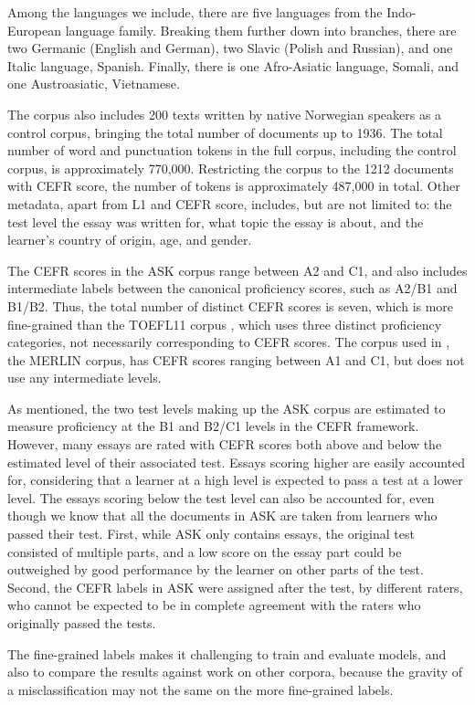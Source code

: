 Among the languages we include, there are five languages from the
Indo-European language family. Breaking them further down into branches,
there are two Germanic (English and German), two Slavic (Polish and Russian),
and one Italic language, Spanish. Finally, there is one Afro-Asiatic
language, Somali, and one Austroasiatic, Vietnamese.

The corpus also includes 200 texts written by native Norwegian speakers as a
control corpus, bringing the total number of documents up to 1936. The total
number of word and punctuation tokens in the full corpus, including the
control corpus, is approximately 770,000. Restricting the corpus to the 1212
documents with \ac{CEFR} score, the number of tokens is approximately 487,000
in total. Other metadata, apart from L1 and CEFR score, includes, but are not
limited to: the test level the essay was written for, what topic the essay
is about, and the learner's country of origin, age, and gender.

The CEFR scores in the ASK corpus range between A2 and C1, and also includes
intermediate labels between the canonical proficiency scores, such as A2/B1
and B1/B2. Thus, the total number of distinct CEFR scores is seven, which is
more fine-grained than the TOEFL11 corpus \autocite{blanchard13}, which uses
three distinct proficiency categories, not necessarily corresponding to CEFR
scores. The corpus used in \textcite{vajjala18universalCEFR}, the MERLIN
corpus, has CEFR scores ranging between A1 and C1, but does not use any
intermediate levels.

As mentioned, the two test levels making up the ASK corpus are estimated to
measure proficiency at the B1 and B2/C1 levels in the CEFR framework.
However, many essays are rated with CEFR scores both above and below the
estimated level of their associated test. Essays scoring higher are easily
accounted for, considering that a learner at a high level is expected to pass
a test at a lower level. The essays scoring below the test level can also be
accounted for, even though we know that all the documents in ASK are taken
from learners who passed their test. First, while ASK only contains essays,
the original test consisted of multiple parts, and a low score on the essay
part could be outweighed by good performance by the learner on other parts of
the test. Second, the CEFR labels in ASK were assigned after the test, by
different raters, who cannot be expected to be in complete agreement with the
raters who originally passed the tests.

The fine-grained labels makes it challenging to train and evaluate models,
and also to compare the results against work on other corpora, because the
gravity of a misclassification may not the same on the more fine-grained
labels.


